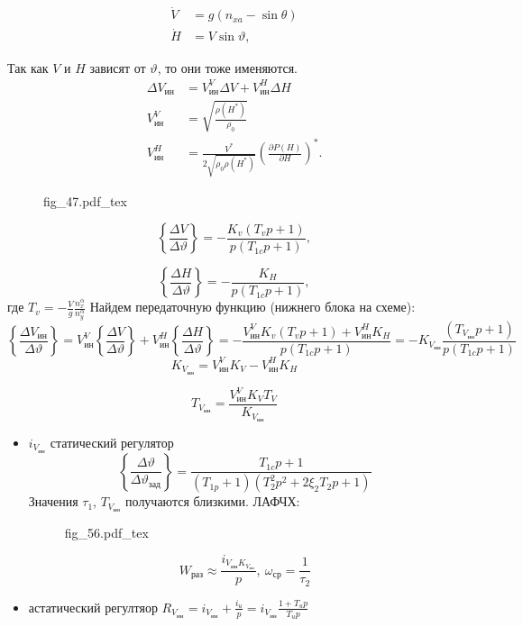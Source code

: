 \documentclass{article}
\newcommand{\incfig}[1]{
    {#1.pdf_tex}
}
\begin{document}
\begin{align*}
	\dot{V} & = g(n_{xa} - \sin{\theta}) \\ 
	\dot{H} & = V \sin{\vartheta} ,
\end{align*}

Так как $V$ и $H$ зависят от $\vartheta$, то они тоже именяются.
\begin{align*}
	\Delta V_\text{ин} & = V_\text{ин}^V \Delta V + V_\text{ин}^H \Delta H                                                     \\
	V_\text{ин}^V      & = \sqrt{\frac{\rho(H^*)}{\rho_0}}                                                           \\
	V_\text{ин}^H      & = \frac{V^*}{2 \sqrt{\rho_0 \rho(H^*)}} \left( \frac{\partial P(H)}{\partial H} \right)^*.
\end{align*}

\begin{figure}[H]
	\centering
	\incfig{fig_47}
	\label{fig:fig_47}
\end{figure}

\[
	\left\{ \frac{\Delta V}{\Delta \vartheta} \right\} = - \frac{K_v(T_v p + 1)}{p(T_{1c} p + 1)},
\]

\[
	\left\{ \frac{\Delta H}{\Delta \vartheta} \right\} = - \frac{K_H}{p(T_{1c} p + 1)},
\]
где $T_v = -\frac{V}{g} \frac{n_x^\alpha}{ n_y^\alpha}$
Найдем передаточную функцию (нижнего блока на схеме):
\[
	\left\{ \frac{\Delta V_\text{ин}}{\Delta \vartheta} \right\} = V_\text{ин}^V \left\{ \frac{\Delta V}{\Delta \vartheta} \right\} + V_\text{ин}^H \left\{ \frac{\Delta H }{\Delta \vartheta} \right\} = - \frac{ V_\text{ин}^V K_v (T_v p + 1) + V_\text{ин}^H K_H}{p(T_{1c} p + 1)} = -K_{ V_\text{ин}} \frac{(T_{ V_\text{ин}} p + 1)}{p (T_{1c} p +1)}
\]
\[
	K_{ V_\text{ин}} = V_\text{ин}^V K_V  - V_\text{ин}^H K_H
\]

\[
	T_{ V_\text{ин}}  =\frac{ V_\text{ин}^V K_V T_V}{ K_{ V_\text{ин}}}
\]
\begin{itemize}
	\item  $i_{ V_\text{ин}}$ статический регулятор
	      \[
		      \left\{ \frac{\Delta \vartheta}{\Delta \vartheta_\text{зад}} \right\} = \frac{T_{1c}p + 1}{ (T_{1p} + 1)( T_2^2 p^2 + 2 \xi_2 T_2p + 1) }
	      \]
	      Значения $\tau_1$, $T_{ V_\text{ин}}$ получаются близкими.
	      ЛАФЧХ:
	      \begin{figure}[H]
		      \centering
		      \incfig{fig_56}
		      \label{fig:fig_56}
	      \end{figure}
	      \[
		      W_\text{раз} \approx \frac{i_{ V_\text{ин}K_{ V_\text{ин} }}}{p}, \ \omega_\text{ср} = \frac{1}{\tau_2}
	      \]
	\item астатический регултяор $R_{ V_\text{ин}} = i_{ V_\text{ин}} + \frac{ i_u}{p} = i_{ V_\text{ин} } \frac{1 + T_u p }{T_u p}$
\end{itemize}
\end{document}

